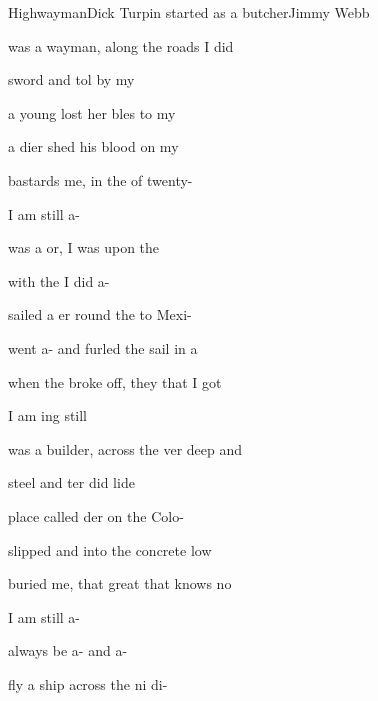 \begin{SBSong}{Highwayman}{Dick Turpin started as a butcher}{Jimmy Webb}
  \begin{SBVerse}
     was a wayman, along the  roads I did 

     sword and tol by my 

     a young  lost her bles to my 

     a dier shed his blood on my 

     bastards  me, in the  of twenty-

     I am still a-
  \end{SBVerse}
  \begin{SBVerse}
     was a or, I was  upon the 

     with the  I did a-

     sailed a er round the  to Mexi-

     went a- and furled the sail in a 

     when the  broke off, they  that I got 

     I am ing still
  \end{SBVerse}
  \begin{SBVerse}
     was a  builder, across the ver deep and 

     steel and ter did lide

     place called der on the  Colo-

     slipped and  into the  concrete low

     buried me,  that great  that knows no 

     I am still a-

     always be a- and a-   
  \end{SBVerse}
  \begin{SBVerse}
     fly a ship across the ni di-


\end{SBVerse}
\end{SBSong}
